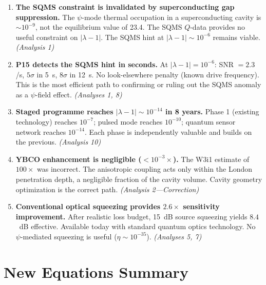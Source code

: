\documentclass[11pt]{article}
\newcommand{\lam}{\lambda}
\begin{document}
\begin{enumerate}
\item \textbf{The SQMS constraint is invalidated by superconducting
gap suppression.} The $\psi$-mode thermal occupation in a
superconducting cavity is $\sim 10^{-9}$, not the equilibrium value
of 23.4. The SQMS $Q$-data provides no useful constraint on
$|\lam-1|$. The SQMS hint at $|\lam-1| \sim 10^{-6}$ remains
viable. \emph{(Analysis 1)}

\item \textbf{P15 detects the SQMS hint in seconds.} At
$|\lam-1| = 10^{-6}$: SNR $= 2.3$/s, $5\sigma$ in 5~s,
$8\sigma$ in 12~s. No look-elsewhere penalty (known drive frequency).
This is the most efficient path to confirming or ruling out the
SQMS anomaly as a $\psi$-field effect. \emph{(Analyses 1, 8)}

\item \textbf{Staged programme reaches $|\lam-1| \sim 10^{-14}$
in 8 years.} Phase 1 (existing technology) reaches $10^{-7}$;
pulsed mode reaches $10^{-10}$; quantum sensor network reaches
$10^{-14}$. Each phase is independently valuable and builds on
the previous. \emph{(Analysis 10)}

\item \textbf{YBCO enhancement is negligible ($<10^{-3}\times$).}
The W3i1 estimate of $100\times$ was incorrect. The anisotropic
coupling acts only within the London penetration depth, a
negligible fraction of the cavity volume. Cavity geometry
optimization is the correct path. \emph{(Analysis 2---Correction)}

\item \textbf{Conventional optical squeezing provides
$2.6\times$ sensitivity improvement.} After realistic loss
budget, 15~dB source squeezing yields $8.4$~dB effective.
Available today with standard quantum optics technology.
No $\psi$-mediated squeezing is useful ($\eta \sim 10^{-35}$).
\emph{(Analyses 5, 7)}
\end{enumerate}

\section*{New Equations Summary}
\end{document}
